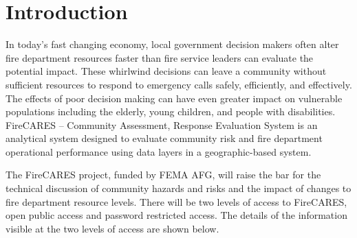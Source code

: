 \documentclass[12pt,oneside]{book}
\begin{document}



\newpage

\cleardoublepage



\renewcommand*\contentsname{\color{fc_blue}Contents}
\tableofcontents

\hypersetup{ 
    linkcolor=fc_orange,         %
    filecolor=fc_orange,      %
    urlcolor=fc_orange,           %
}    

\newpage
\mainmatter

\chapter{Introduction}

In today's fast changing economy, local government decision makers often alter fire department resources faster than fire service leaders can evaluate the potential
impact. These whirlwind decisions can leave a community without sufficient resources to respond to emergency calls safely, efficiently, and effectively. The effects of poor
decision making can have even greater impact on vulnerable populations including the elderly, young children, and people with disabilities. FireCARES -- Community Assessment, Response Evaluation System is an analytical system designed to evaluate community risk and fire department operational performance using data layers in a geographic-based system.

The FireCARES project, funded by FEMA AFG, will raise the bar for the technical discussion of community hazards and risks and the impact of changes to fire department resource levels. There will be two levels of access to FireCARES, open public access and password restricted access. The details of the information visible at the two levels of access are shown below.
\end{document}

